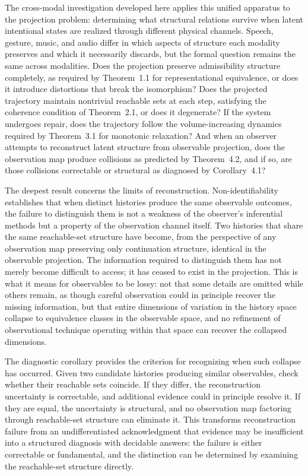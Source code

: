 The cross-modal investigation developed here applies this unified apparatus to the projection problem: determining what structural relations survive when latent intentional states are realized through different physical channels. Speech, gesture, music, and audio differ in which aspects of structure each modality preserves and which it necessarily discards, but the formal question remains the same across modalities. Does the projection preserve admissibility structure completely, as required by Theorem~1.1 for representational equivalence, or does it introduce distortions that break the isomorphism? Does the projected trajectory maintain nontrivial reachable sets at each step, satisfying the coherence condition of Theorem~2.1, or does it degenerate? If the system undergoes repair, does the trajectory follow the volume-increasing dynamics required by Theorem~3.1 for monotonic relaxation? And when an observer attempts to reconstruct latent structure from observable projection, does the observation map produce collisions as predicted by Theorem~4.2, and if so, are those collisions correctable or structural as diagnosed by Corollary~4.1?

The deepest result concerns the limits of reconstruction. Non-identifiability establishes that when distinct histories produce the same observable outcomes, the failure to distinguish them is not a weakness of the observer's inferential methods but a property of the observation channel itself. Two histories that share the same reachable-set structure have become, from the perspective of any observation map preserving only continuation structure, identical in the observable projection. The information required to distinguish them has not merely become difficult to access; it has ceased to exist in the projection. This is what it means for observables to be lossy: not that some details are omitted while others remain, as though careful observation could in principle recover the missing information, but that entire dimensions of variation in the history space collapse to equivalence classes in the observable space, and no refinement of observational technique operating within that space can recover the collapsed dimensions.

The diagnostic corollary provides the criterion for recognizing when such collapse has occurred. Given two candidate histories producing similar observables, check whether their reachable sets coincide. If they differ, the reconstruction uncertainty is correctable, and additional evidence could in principle resolve it. If they are equal, the uncertainty is structural, and no observation map factoring through reachable-set structure can eliminate it. This transforms reconstruction failure from an undifferentiated acknowledgment that evidence may be insufficient into a structured diagnosis with decidable answers: the failure is either correctable or fundamental, and the distinction can be determined by examining the reachable-set structure directly.

